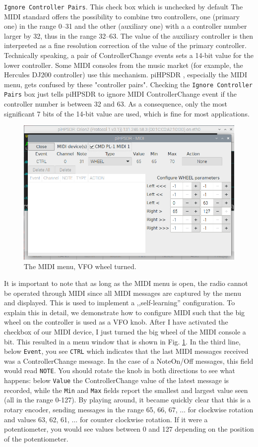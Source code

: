 \documentclass[12pt]{book}
\def\rett#1{\texttt{\color{red}#1}}
\def\pH{pi\-HPSDR }
\begin{document}
\rett{Ignore Controller Pairs}. This check box  which is unchecked by default
The MIDI standard offers the possibility to combine two controllers, one
(primary one) in the range 0--31 and the other (auxiliary one)
with a a controller number larger by 32, thus in
the range 32--63. The value of the auxiliary controller is then interpreted as a
fine resolution correction of the value of the primary controller. Technically
speaking,
a pair of ControllerChange events sets a 14-bit value for the lower controller.
Some MIDI consoles
from the music market (for example, the Hercules DJ200 controller)
use this mechanism. \pH, especially the MIDI menu, gets confused
by these "controller pairs". Checking the \rett{Ignore Controller Pairs} box just tells
\pH to ignore MIDI ControllerChange event if the controller number is between 32 and 63.
As a consequence, only the most significant 7 bits of the 14-bit value are used, which
is fine for most applications.

\begin{figure}[ht]
\center
\includegraphics[width=12cm]{MIDImenu2.png}
\caption{The MIDI menu, VFO wheel turned.}
\label{fig:MIDImenu2}
\end{figure}

It is important to note that as long as the MIDI menu is open, the radio cannot be
operated through MIDI since all MIDI messages are captured by the menu and
displayed. This is used to implement a ,,self-learning'' configuration. To explain
this in detail, we demonstrate how to configure MIDI such that the big wheel on the
controller is used as a VFO knob. After I have activated the checkbox of our
MIDI device, I just turned the big wheel of the MIDI console a bit. This resulted
in a menu window that is shown in Fig. \ref{fig:MIDImenu2}. In the third line,
below \rett{Event}, you see \texttt{CTRL} which indicates that the last MIDI messages
received was a ControllerChange message. In the case of a NoteOn/Off messages, this
field would read \texttt{NOTE}. You should rotate the knob in both directions to
see what happens: below \rett{Value} the ControllerChange value of the latest
message is recorded, while the \rett{Min} and \rett{Max} fields report the smallest
and largest value seen (all in the range 0-127). By playing around, it became
quickly clear that this is a rotary encoder, sending messages in the range 65, 66, 67,
$\ldots$ for clockwise rotation and values 63, 62, 61, $\ldots$ for counter clockwise
rotation. If it were a potentiometer, you would see values between 0 and 127
depending on the position of the potentiometer.
\end{document}

